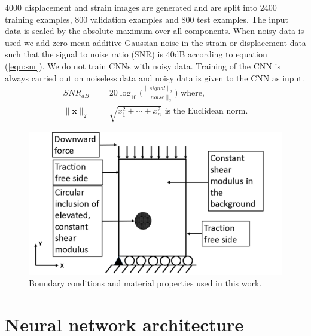 \documentclass[12pt]{article}
\newcommand{\ber}{\begin{eqnarray}}
\newcommand{\eer}{\end{eqnarray}}
\begin{document}
$4000$ displacement and strain images are generated and are split into $2400$ training examples, $800$ validation examples and $800$ test examples. The input data is scaled by the absolute maximum over all components. When noisy data is used we add zero mean additive Gaussian noise in the strain or displacement data such that the signal to noise ratio (SNR) is 40dB according to equation (\ref{eqn:snr}). We do not train CNNs with noisy data. Training of the CNN is always carried out on noiseless data and noisy data is given to the CNN as input.
\begin{subequations}
\ber
  SNR_{dB} &=& 20\log_{10}{\Bigg (}\frac{\|signal\|_{2}}{\|noise\|_{2}}{\Bigg )} \label{eqn:snr} \text{ where, }\\
  \|\mathbf{x}\|_{2} &=& \sqrt{x_{1}^{2}+\cdots+x_{n}^2}  \text{ is the Euclidean norm.}   \label{eqn:eucnorm}
  \eer
  
\end{subequations}  
%
\begin{figure}[h] 
   \centering
    \includegraphics[totalheight=5cm]{Figures/bc.png}
  \caption{\label{fig:bc}Boundary conditions and material properties used in this work. }
\end{figure}
%
\section{Neural network architecture}
\end{document}
